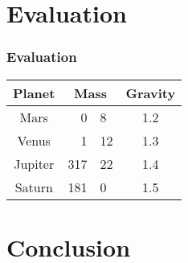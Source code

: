 \documentclass{beamer}
\begin{document}
\section{Evaluation}
\begin{frame}
	\frametitle{Evaluation}
	\begin{center}
	\begin{tabular}{cr@{.}lc}
	\hline
	Planet & \multicolumn{2}{c}{Mass} & Gravity \\
	\hline
	Mars	& 0&8		& 1.2 \\
	Venus	& 1&12		& 1.3 \\
	Jupiter	& 317&22	& 1.4 \\
	Saturn	& 181&0		& 1.5 \\
	\hline
	\end{tabular}
	\end{center}
\end{frame}


\section{Conclusion}
\end{document}
